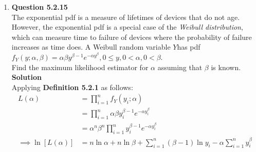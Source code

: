 \documentclass{uofa-eng-assignment}
\begin{document}
 \maketitle
\begin{enumerate}
    \item[]
        \textbf{Question 5.2.15} \\
        The exponential pdf is a measure of lifetimes of devices that do not age. However, the exponential
        pdf is a special case of the \textit{Weibull distribution}, which can measure time to failure of
        devices where the probability of failure increases as time does. A Weibull random variable $Y$has
        pdf
        $
            f_Y(y; \alpha, \beta) = \alpha \beta y^{\beta - 1} e^{-\alpha y^\beta},
            0 \leq y, 0 <\alpha, 0 < \beta
        $. \\
        Find the maximum likelihood estimator for $\alpha$ assuming that $\beta$ is known. \\
        \textbf{Solution} \\
        Applying \textbf{Definition 5.2.1} as follows:
        \begin{align*}
            L(\alpha)                                        & = \prod_{i=1}^{n} f_Y(y_i; \alpha)                                                                  \\
                                                             & = \prod_{i=1}^{n} \alpha \beta y_i^{\beta - 1} e^{-\alpha y_i^\beta}                                \\
                                                             & = \alpha^n \beta^n \prod_{i=1}^{n} y_i^{\beta - 1} e^{-\alpha y_i^\beta}                            \\
            \implies
            \ln [L(\alpha)]                                  & = n \ln \alpha + n \ln \beta + \sum_{i=1}^{n} (\beta - 1) \ln y_i - \alpha \sum_{i=1}^{n} y_i^\beta \\

\end{align*}
\end{enumerate}
\end{document}
